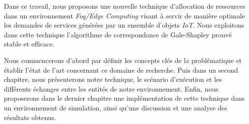 \par Dans ce travail, nous proposons une nouvelle technique d'allocation de ressources dans un environnement \emph{Fog/Edge Computing} visant à servir de manière optimale les demandes de services générées par un ensemble d'objets \emph{IoT}. Nous exploitons dans cette technique l'algorithme de correspondance de Gale-Shapley prouvé stable et efficace.\par
Nous commencerons d'abord par définir les concepts clés de la problématique et établir l'état de l'art concernant ce domaine de recherche. Puis dans un second chapitre, nous présenterons notre technique, le scénario d'exécution et les différents échanges entre les entités de notre environnement. Enfin, nous proposerons dans le dernier chapitre une implémentation de cette technique dans un environnement de simulation, ainsi qu'une discussion et une analyse des résultats obtenus.
